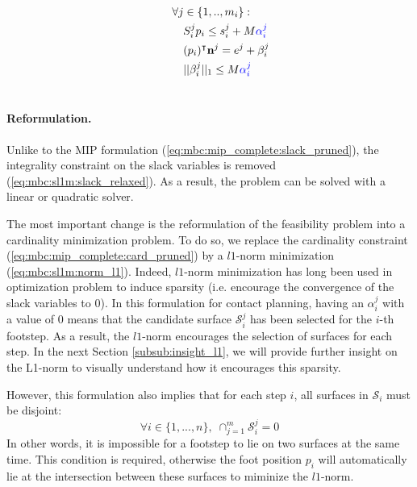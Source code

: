 \begin{align}
                                \quad & \quad \forall j \in \{1,..,m_i\} : \nonumber\\
                                    \quad & \quad \quad S_i^j p_i \leq s_i^j + M \textcolor{blue}{\alpha_i^j}  \nonumber\\
                                    \quad & \quad \quad (p_i)^{\intercal} \textbf{n}^j = e^j + \beta_i^j \nonumber\\
                                    \quad & \quad \quad ||\beta_i^j||_1 \leq M \textcolor{blue}{\alpha_i^j} \nonumber\\
                                    \nonumber
\end{align}
\paragraph{Reformulation.}
Unlike to the MIP formulation (\ref{eq:mbc:mip_complete:slack_pruned}), the integrality constraint on the slack variables is removed (\ref{eq:mbc:sl1m:slack_relaxed}). 
As a result, the problem can be solved with a linear or quadratic solver.

The most important change is the reformulation of the feasibility problem into a cardinality minimization problem.
To do so, we replace the cardinality constraint (\ref{eq:mbc:mip_complete:card_pruned}) by a $l1$-norm minimization (\ref{eq:mbc:sl1m:norm_l1}).
Indeed, $l1$-norm minimization has long been used in optimization problem to induce sparsity (i.e. encourage the convergence of the slack variables to 0). 
In this formulation for contact planning, having an $\alpha_i^j$ with a value of 0 means that the candidate surface $\mathcal{S}_i^j$ has been selected for the $i$-th footstep. 
As a result, the $l1$-norm encourages the selection of surfaces for each step.
In the next Section \ref{subsub:insight_l1}, we will provide further insight on the L1-norm to visually understand how it encourages this sparsity.

However, this formulation also implies that for each step $i$, all surfaces in $\mathcal{S}_i$ must be disjoint:
\begin{equation}
    \forall i \in \{1,...,n\},\; \cap^m_{j=1} \mathcal{S}^j_i = 0
\end{equation}
In other words, it is impossible for a footstep to lie on two surfaces at the same time. This condition is required, otherwise the foot position $p_i$ will automatically lie at the intersection between these surfaces to miminize the $l1$-norm.


